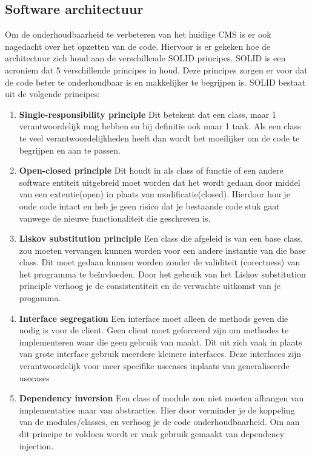\subsection{Software architectuur}
Om de onderhoudbaarheid te verbeteren van het huidige CMS is er ook nagedacht over het opzetten van de code.
Hiervoor is er gekeken hoe de architectuur zich houd aan de verschillende SOLID principes. 
SOLID is een acroniem dat 5 verschillende principes in houd.
Deze principes zorgen er voor dat de code beter te onderhoudbaar is en makkelijker te begrijpen is.
SOLID bestaat uit de volgende principes:

\begin{enumerate}
    \item \textbf{Single-responsibility principle}
    Dit betekent dat een class, maar 1 verantwoordelijk mag hebben en bij definitie ook maar 1 taak.
    Als een class te veel verantwoordelijkheden heeft dan wordt het moeilijker om de code te begrijpen en aan te passen.

    \item \textbf{Open-closed principle}
    Dit houdt in als class of functie of een andere software entiteit uitgebreid moet worden dat het wordt gedaan door middel van een extentie(open) in plaats van modificatie(closed).
    Hierdoor hou je oude code intact en heb je geen risico dat je bestaande code stuk gaat vanwege de nieuwe functionaliteit die geschreven is. 
        
    \item \textbf{Liskov substitution principle} 
    Een class die afgeleid is van een base class, zou moeten vervangen kunnen worden voor  een andere instantie van die base class.
    Dit moet gedaan kunnen worden zonder de validiteit (corectness) van het programma te beïnvloeden.
    Door het gebruik van het Liskov substitution principle verhoog je de consistentiteit en de verwachte uitkomst van je progamma.

    \item \textbf{Interface segregation} 
    Een interface moet alleen de methods geven die nodig is voor de client. 
    Geen client moet geforceerd zijn om methodes te implementeren waar die geen gebruik van maakt.
    Dit uit zich vaak in plaats van grote interface gebruik meerdere kleinere interfaces.
    Deze interfaces zijn verantwoordelijk voor meer specifike usecases inplaats van generaliseerde usecases

    \item \textbf{Dependency inversion} 
    Een class of module zou niet moeten afhangen van implementaties maar van abstracties.
    Hier door verminder je de koppeling van de modules/classes, en verhoog je de code onderhoudbaarheid.
    Om aan dit principe te voldoen wordt er vaak gebruik gemaakt van dependency injection.

\end{enumerate}

